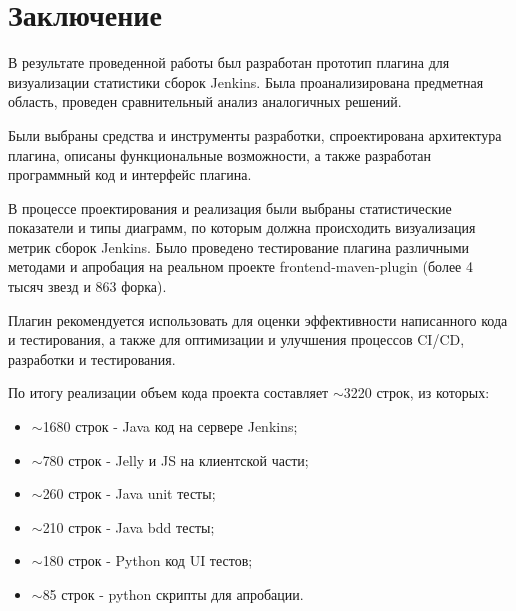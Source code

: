 \chapter*{Заключение} \label{ch-conclusion}

В результате проведенной работы был разработан прототип плагина для визуализации статистики сборок Jenkins. Была проанализирована предметная область, проведен сравнительный анализ аналогичных решений.

Были выбраны средства и инструменты разработки, спроектирована архитектура плагина, описаны функциональные возможности, а также разработан программный код и интерфейс плагина.

В процессе проектирования и реализация были выбраны статистические показатели и типы диаграмм, по которым должна происходить визуализация метрик сборок Jenkins. Было проведено тестирование плагина различными методами и апробация на реальном проекте frontend-maven-plugin (более 4 тысяч звезд и 863 форка).

Плагин рекомендуется использовать для оценки эффективности написанного кода и тестирования, а также для оптимизации и улучшения процессов CI/CD, разработки и тестирования.

По итогу реализации объем кода проекта составляет $\sim$3220 строк, из которых:

\begin{itemize}
	\item $\sim$1680 строк  - Java код на сервере Jenkins;
	\item $\sim$780 строк - Jelly и JS на клиентской части;
	\item $\sim$260 строк - Java unit тесты;
	\item $\sim$210 строк - Java bdd тесты;
	\item $\sim$180 строк - Python код UI тестов;
	\item $\sim$85 строк - python скрипты для апробации.
\end{itemize}
